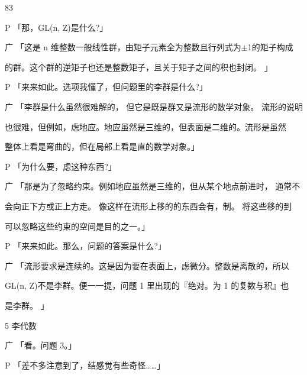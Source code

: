 83\par
P 「那，GL(n, Z)是什么?」\par
广 「这是 n 维整数一般线性群，由矩子元素全为整数且行列式为$\pm$1的矩子构成\par
的群。这个群的逆矩子也还是整数矩子，且关于矩子之间的积也封闭。 」\par
P 「来来如此。选项我懂了，但问题里的李群是什么?」\par
广 「李群是什么虽然很难解的， 但它是既是群又是流形的数学对象。 流形的说明\par
也很难，但例如，虑地应。地应虽然是三维的，但表面是二维的。流形是虽然\par
整体上看是弯曲的，但在局部上看是直的数学对象。」\par
P 「为什么要，虑这种东西?」\par
广 「那是为了忽略约束。例如地应虽然是三维的，但从某个地点前进时， 通常不\par
会向正下方或正上方走。 像这样在流形上移的的东西会有，制。 将这些移的到\par
可以忽略这些约束的空间是目的之一。」\par
P 「来来如此。那么，问题的答案是什么?」\par
广 「流形要求是连续的。这是因为要在表面上，虑微分。整数是离散的，所以\par
GL(n, Z)不是李群。便一一提，问题 1 里出现的『绝对。为 1 的复数与积』也\par
是李群。 」\par
5 李代数\par
广 「看。问题 3。」\par
P 「差不多注意到了，结感觉有些奇怪……」\par

